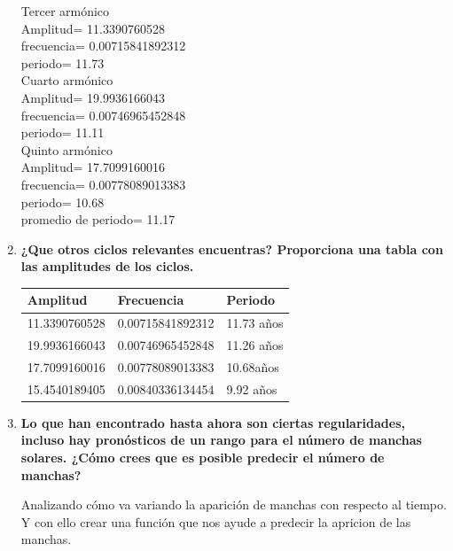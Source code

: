 \documentclass[11pt]{article}
\begin{document}
\begin{enumerate}
Tercer armónico\\
Amplitud= 11.3390760528\\
frecuencia= 0.00715841892312\\
periodo= 11.73\\

Cuarto armónico\\
Amplitud= 19.9936166043\\
frecuencia= 0.00746965452848\\
periodo= 11.11\\

Quinto armónico\\
Amplitud= 17.7099160016\\
frecuencia= 0.00778089013383\\
periodo= 10.68\\

promedio de periodo= 11.17

\item\textbf{¿Que otros ciclos relevantes encuentras? Proporciona una tabla con las amplitudes de los ciclos.}


\begin{table}[htbp]
\begin{center}
\begin{tabular}{|l|l|l|}
\hline \hline
Amplitud & Frecuencia & Periodo  \\
\hline \hline
11.3390760528 & 0.00715841892312 & 11.73 años \\ \hline
19.9936166043
 & 0.00746965452848 & 11.26 años \\ \hline
17.7099160016 & 0.00778089013383 & 10.68años \\ \hline
15.4540189405 & 0.00840336134454
 & 9.92 años \\ \hline

\end{tabular}
\label{tabla:sencilla}
\end{center}
\end{table}

\item\textbf{Lo que han encontrado hasta ahora son ciertas regularidades, incluso hay pronósticos de un rango para el número de manchas solares. ¿Cómo crees que es posible predecir el número de manchas?}

Analizando cómo va variando la aparición de manchas con respecto al tiempo. Y con ello crear una función que nos ayude a predecir la apricion de las manchas. 

\end{enumerate}
\end{document}
